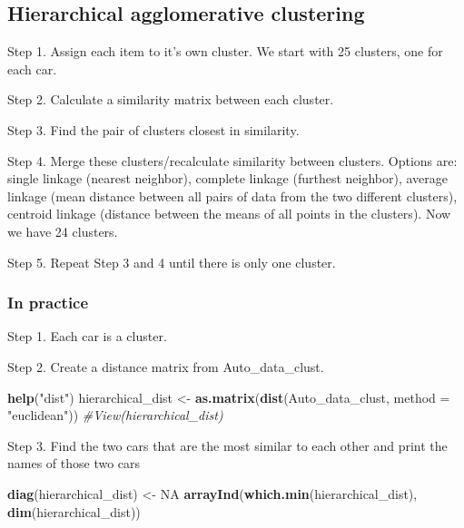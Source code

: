 \documentclass[11pt,]{article}
\newenvironment{Shaded}{\begin{snugshade}}{\end{snugshade}}
\newcommand{\CommentTok}[1]{\textcolor[rgb]{0.56,0.35,0.01}{\textit{#1}}}
\newcommand{\DataTypeTok}[1]{\textcolor[rgb]{0.13,0.29,0.53}{#1}}
\newcommand{\KeywordTok}[1]{\textcolor[rgb]{0.13,0.29,0.53}{\textbf{#1}}}
\newcommand{\NormalTok}[1]{#1}
\newcommand{\OtherTok}[1]{\textcolor[rgb]{0.56,0.35,0.01}{#1}}
\newcommand{\StringTok}[1]{\textcolor[rgb]{0.31,0.60,0.02}{#1}}
\begin{document}
\hypertarget{hierarchical-agglomerative-clustering}{%
\subsection{Hierarchical agglomerative
clustering}\label{hierarchical-agglomerative-clustering}}

Step 1. Assign each item to it's own cluster. We start with 25 clusters,
one for each car.

Step 2. Calculate a similarity matrix between each cluster.

Step 3. Find the pair of clusters closest in similarity.

Step 4. Merge these clusters/recalculate similarity between clusters.
Options are: single linkage (nearest neighbor), complete linkage
(furthest neighbor), average linkage (mean distance between all pairs of
data from the two different clusters), centroid linkage (distance
between the means of all points in the clusters). Now we have 24
clusters.

Step 5. Repeat Step 3 and 4 until there is only one cluster.

\hypertarget{in-practice}{%
\subsubsection{In practice}\label{in-practice}}

Step 1. Each car is a cluster.

Step 2. Create a distance matrix from Auto\_data\_clust.

\begin{Shaded}
\begin{Highlighting}[]
\KeywordTok{help}\NormalTok{(}\StringTok{"dist"}\NormalTok{)}
\NormalTok{hierarchical_dist <-}\StringTok{ }\KeywordTok{as.matrix}\NormalTok{(}\KeywordTok{dist}\NormalTok{(Auto_data_clust, }\DataTypeTok{method =} \StringTok{"euclidean"}\NormalTok{))}
\CommentTok{#View(hierarchical_dist)}
\end{Highlighting}
\end{Shaded}

Step 3. Find the two cars that are the most similar to each other and
print the names of those two cars

\begin{Shaded}
\begin{Highlighting}[]
\KeywordTok{diag}\NormalTok{(hierarchical_dist) <-}\StringTok{ }\OtherTok{NA}
\KeywordTok{arrayInd}\NormalTok{(}\KeywordTok{which.min}\NormalTok{(hierarchical_dist), }\KeywordTok{dim}\NormalTok{(hierarchical_dist))}
\end{Highlighting}
\end{Shaded}
\end{document}
